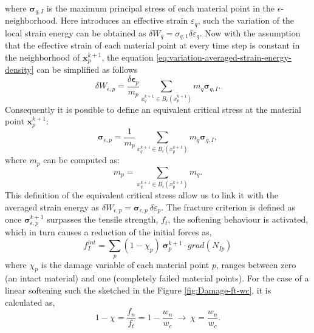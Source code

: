 \message{ !name(2020_EFM_MPM_Eigensoftening.tex)}\documentclass[preprint,12pt,a4paper]{elsarticle}
\newcommand{\vec}[1]{
  \ensuremath{\mathbf{{#1}}}
}
\newcommand{\tens}[1]{
  \ensuremath{\mathbf{{#1}}}
}
\newcommand\Grad[1]{grad({#1})}
\begin{document}
where $\tens{\sigma}_{q,I}$ is the maximum principal stress of each
material point in the $\epsilon$-neighborhood. Here
\cite{Navas_2017_ES} introduces an effective strain $\varepsilon_q$,
such the variation of the local strain energy can be obtained as
$\delta W_q = \sigma_{q,1} \delta\varepsilon_q$. Now with the assumption
that the effective strain of each material point at every time step
is constant in the neighborhood of $\vec{x}_p^{k+1}$, the equation
\eqref{eq:variation-averaged-strain-energy-density} can be simplified
as follows
\begin{equation}
  \label{eq:variation-averaged-strain-energy-density-simpli}
  \delta W_{\epsilon,p} =
  \frac{\delta \tens{\epsilon}_p}{m_p} \sum_{x_q^{k+1} \in
  B_{\epsilon}(x_p^{k+1})} m_q \tens{\sigma}_{q,I}. 
\end{equation}
Consequently it is possible to define an equivalent critical stress at the
material point $\vec{x}_p^{k+1}$:
\begin{equation}
  \label{eq:equivalent-critical-stress}
  \tens{\sigma}_{\epsilon,p} =
  \frac{1}{m_p} \sum_{x_q^{k+1} \in
  B_{\epsilon}(x_p^{k+1})} m_q \tens{\sigma}_{q,I}, 
\end{equation}
where $m_p$ can be computed as:
\begin{equation}
  \label{eq:averaged-mass}
  m_p = \sum_{x_q^{k+1} \in B_{\epsilon}(x_p^{k+1})} m_q.
\end{equation}
This definition of the equivalent critical stress allow us to
link it with the averaged strain energy as $\delta W_{\epsilon,p} =
 \tens{\sigma}_{\epsilon,p}\ \delta\varepsilon_p$. The fracture
criterion is defined as once $\tens{\sigma}_{\epsilon,p}^{k+1}$
surpasses the tensile strength, $f_t$, the softening behaviour is
activated, which in turn causes a reduction of the initial forces as,
 \begin{equation}
   \label{eq:f-int-damaged}
   f^{int}_I = \sum_p (1 - \chi_p)\ \tens{\sigma}_{p}^{k+1} \cdot \Grad{N_{Ip}}
 \end{equation}
where $\chi_p$ is the damage variable of each material point $p$,
ranges between zero (an intact material) and one (completely failed
material points). For the case of a linear softening such the sketched
in the Figure \ref{fig:Damage-ft-wc}, it is calculated as,
 \begin{equation}
   \label{eq:damaged-variable-chi}
   1 - \chi = \frac{f_n}{f_t} = 1 - \frac{w_n}{w_c}\ \rightarrow\ \chi
   = \frac{w_n}{w_c}.
 \end{equation}
 
\end{document}
